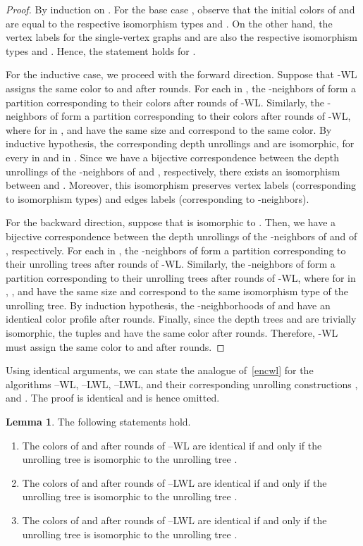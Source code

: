 \documentclass{article}
\theoremstyle{definition}
\newtheorem{lemma}[theorem]{Lemma}
\newcommand{\kwl}{-\textsf{WL}\xspace}
\newcommand{\deltakwl}{--\textsf{WL}\xspace}
\newcommand{\localkwl}{--\textsf{LWL}\xspace}
\newcommand{\pluskwl}{--\textsf{LWL}\xspace}
\begin{document}
\begin{proof}
	By induction on . For the base case , observe that the initial colors of  and  are equal to the 
	respective isomorphism types  and . On the other hand, the vertex labels for the single-vertex graphs  and  are also the respective isomorphism types  and . Hence, the statement holds for . 
	
	For the inductive case, we proceed with the forward direction. Suppose that \kwl assigns the same color to  and  after  rounds. For each  in , the -neighbors of  form a partition  corresponding to their colors after  rounds of \kwl. Similarly, the -neighbors of  form a partition  corresponding to their colors after  rounds of \kwl, where for  in ,  and  have the same size and correspond to the same color. By inductive hypothesis, the corresponding depth  unrollings  and  are isomorphic, for every  in  and  in . Since we have a bijective correspondence between the depth  unrollings of the -neighbors of  and , respectively, there exists an isomorphism between  and . Moreover, this isomorphism preserves vertex labels (corresponding to isomorphism types) and edges labels (corresponding to -neighbors). 
	
	For the backward direction, suppose that  is isomorphic to . Then, we have a bijective correspondence between the depth  unrollings of the -neighbors of  and of , respectively. For each  in , the -neighbors of  form a partition  corresponding to their unrolling trees after  rounds of -WL. Similarly, the -neighbors of  form a partition  corresponding to their unrolling trees after  rounds of -WL, where for  in , , and  have the same size and correspond to the same isomorphism type of the unrolling tree. By induction hypothesis, the -neighborhoods of  and  have an identical color profile after  rounds. Finally, since the depth  trees  and  are trivially isomorphic, the tuples  and  have the same color after  rounds. Therefore, \kwl must assign the same color to  and  after  rounds.  
\end{proof}

Using identical arguments, we can state the analogue of~\cref{encwl} for the algorithms \deltakwl, \localkwl, \pluskwl, and their corresponding unrolling constructions ,  and . The proof is identical and is hence omitted.

\begin{lemma}\label{enc}
	The following statements hold. 
	\begin{enumerate}
		\item The colors of  and  after  rounds of \deltakwl are identical 
		if and only if the unrolling tree  is isomorphic to the unrolling tree .   
		\item The colors of  and  after  rounds of \localkwl are identical 
		if and only if the unrolling tree  is isomorphic to the unrolling tree .   
		\item The colors of  and  after  rounds of \pluskwl are identical 
		if and only if the unrolling tree  is isomorphic to the unrolling tree .   
	\end{enumerate}
\end{lemma}
\end{document}

